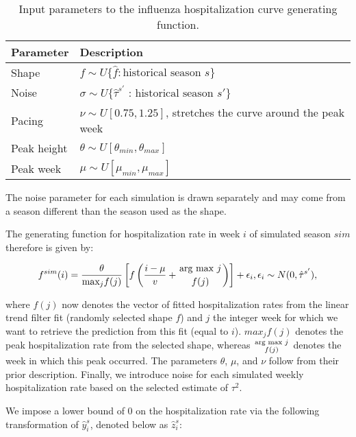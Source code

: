 \documentclass[10pt,letterpaper]{article}
\begin{document}
\begin{table}

\caption{\label{tab:sim-param-input-table}Input parameters to the influenza hospitalization curve generating function.}
\centering
\begin{threeparttable}
\begin{tabular}[t]{ll}
\toprule
Parameter & Description\\
\midrule
Shape & $f \sim U \{ \hat{f} : \text{historical season } s \}$\\
Noise & $\sigma \sim U \{\hat{\tau}^{s'} \text{ : historical season } s' \}$\\
Pacing & $\nu \sim U[0.75, 1.25]$, stretches the curve around the peak week\\
Peak height & $\theta \sim U\left[\theta_{min} , \theta_{max}\right]$\\
Peak week & $\mu \sim U[\mu_{min}, \mu_{max}]$\\
\bottomrule
\end{tabular}
\begin{tablenotes}
\item The noise parameter for each simulation is drawn separately and may come from a season different than the season used as the shape.
\end{tablenotes}
\end{threeparttable}
\end{table}

The generating function for hospitalization rate in week \(i\) of
simulated season \(sim\) therefore is given by:

\[f^{sim} (i) = \frac{\theta}{\text{max}_j f(j)} \left[ f \left( \frac{i - \mu}{v} + \genfrac{}{}{0pt}{}{\text{arg max }{j}}{f(j)} \right) \right] + \epsilon_i, \epsilon_i \sim N(0, \hat{\tau}^{s'}),\]

where \(f(j)\) now denotes the vector of fitted hospitalization rates
from the linear trend filter fit (randomly selected shape \(f\)) and
\(j\) the integer week for which we want to retrieve the prediction from
this fit (equal to \(i\)). \(max_j f(j)\) denotes the peak
hospitalization rate from the selected shape, whereas
\(\genfrac{}{}{0pt}{}{\text{arg max } {j}}{f(j)}\) denotes the week in
which this peak occurred. The parameters \(\theta\), \(\mu\), and
\(\nu\) follow from their prior description. Finally, we introduce noise
for each simulated weekly hospitalization rate based on the selected
estimate of \(\tau^2\).

We impose a lower bound of 0 on the hospitalization rate via the
following transformation of \(\hat{y}^s_i\), denoted below as
\(\hat{z}^s_i\):
\end{document}
